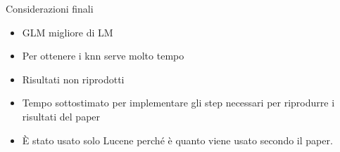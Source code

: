 \begin{frame}{Considerazioni finali}
    \begin{itemize}
        \item GLM migliore di LM
        \item Per ottenere i knn serve molto tempo
        \item Risultati non riprodotti
        \item Tempo sottostimato per implementare gli step necessari per riprodurre i risultati del paper
        \item È stato usato solo Lucene perché è quanto viene usato secondo il paper.
    \end{itemize}
\end{frame}